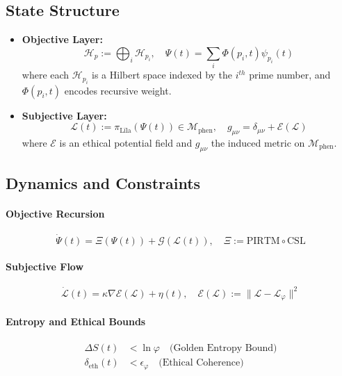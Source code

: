 \documentclass[12]{amsart}
\theoremstyle{plain}
\begin{document}
\subsection{State Structure}
\begin{itemize}
  \item \textbf{Objective Layer:}
    \begin{equation}
      \mathcal{H}_p := \bigoplus_{i} \mathcal{H}_{p_i}, \quad \Psi(t) = \sum_i \Phi(p_i, t) \psi_{p_i}(t)
    \end{equation}
    where each $\mathcal{H}_{p_i}$ is a Hilbert space indexed by the $i^{th}$ prime number, and $\Phi(p_i, t)$ encodes recursive weight.

  \item \textbf{Subjective Layer:}
    \begin{equation}
      \mathcal{L}(t) := \pi_{\text{Līla}}(\Psi(t)) \in \mathcal{M}_{\text{phen}}, \quad g_{\mu\nu} = \delta_{\mu\nu} + \mathcal{E}(\mathcal{L})
    \end{equation}
    where $\mathcal{E}$ is an ethical potential field and $g_{\mu\nu}$ the induced metric on $\mathcal{M}_{\text{phen}}$.
\end{itemize}

\subsection{Dynamics and Constraints}
\paragraph{Objective Recursion}
\begin{equation}
  \dot{\Psi}(t) = \Xi(\Psi(t)) + \mathcal{G}(\mathcal{L}(t)), \quad \Xi := \text{PIRTM} \circ \text{CSL}
\end{equation}

\paragraph{Subjective Flow}
\begin{equation}
  \dot{\mathcal{L}}(t) = \kappa \nabla \mathcal{E}(\mathcal{L}) + \eta(t), \quad \mathcal{E}(\mathcal{L}) := \|\mathcal{L} - \mathcal{L}_\varphi\|^2
\end{equation}

\paragraph{Entropy and Ethical Bounds}
\begin{align}
  \Delta S(t) &< \ln \varphi \quad \text{(Golden Entropy Bound)} \\
  \delta_{\text{eth}}(t) &< \epsilon_\varphi \quad \text{(Ethical Coherence)}
\end{align}
\end{document}
